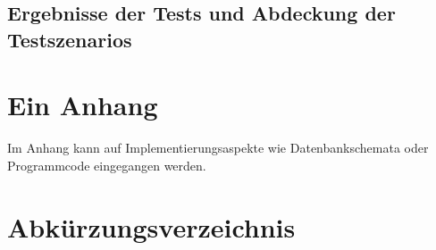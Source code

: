 \documentclass[listof=totocnumbered, bibliography=totocnumbered]{scrreprt}
\begin{document}
  
  \newpage
  
  \section{Ergebnisse der Tests und Abdeckung der Testszenarios}
  
  
  
  \appendix
  
  \chapter{Ein Anhang}
  
  Im Anhang kann auf Implementierungsaspekte wie Datenbankschemata
  oder Programmcode eingegangen werden.
  
  
  \chapter{Abkürzungsverzeichnis}
  \begin{acronym}
    \setlength{\itemsep}{-\parsep}
  \end{acronym}
  
  
  \listoffigures
  
  
  \listoftables
  
  
  
  \cleardoublepage
  
\end{document}
